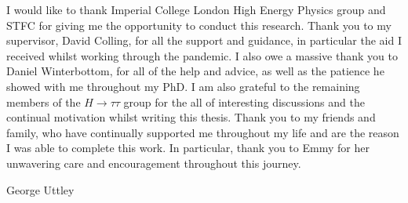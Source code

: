 \begin{titlepage}
\begin{adjustwidth}{1cm}{1cm}
I would like to thank Imperial College London High Energy Physics group and STFC for giving me the opportunity to conduct this research.
Thank you to my supervisor, David Colling, for all the support and guidance, in particular the aid I received whilst working through the pandemic.
I also owe a massive thank you to Daniel Winterbottom, for all of the help and advice, as well as the patience he showed with me throughout my PhD.
I am also grateful to the remaining members of the $H\rightarrow\tau\tau$ group for the all of interesting discussions and the continual motivation whilst writing this thesis.
Thank you to my friends and family, who have continually supported me throughout my life and are the reason I was able to complete this work.
In particular, thank you to Emmy for her unwavering care and encouragement throughout this journey.

\begin{FlushRight}
George Uttley
\end{FlushRight}
\end{adjustwidth}
\vspace*{\fill}

\end{titlepage}